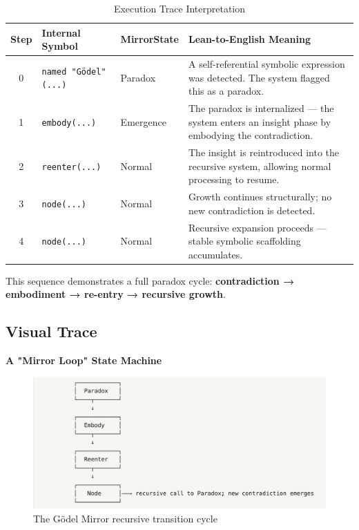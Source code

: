 \documentclass[manuscript,nonacm]{acmart}
\begin{document}
\begin{table}[H]
  \caption{Execution Trace Interpretation}
  \label{tab:execution-trace}
  \begin{tabular}{@{}cllp{7cm}@{}}
    \toprule
    \textbf{Step} & \textbf{Internal Symbol} & \textbf{MirrorState} & \textbf{Lean-to-English Meaning} \\
    \midrule
    0 & \texttt{named "Gödel" (...)} & Paradox & A self-referential symbolic expression was detected. The system flagged this as a paradox. \\
    1 & \texttt{embody(...)} & Emergence & The paradox is internalized — the system enters an insight phase by embodying the contradiction. \\
    2 & \texttt{reenter(...)} & Normal & The insight is reintroduced into the recursive system, allowing normal processing to resume. \\
    3 & \texttt{node(...)} & Normal & Growth continues structurally; no new contradiction is detected. \\
    4 & \texttt{node(...)} & Normal & Recursive expansion proceeds — stable symbolic scaffolding accumulates. \\
    \bottomrule
  \end{tabular}
\end{table}

This sequence demonstrates a full paradox cycle: \textbf{contradiction → embodiment → re-entry → recursive growth}.

\subsection{Visual Trace}

\textbf{A "Mirror Loop" State Machine}

\begin{figure}[H]
    \centering
    \includegraphics[width=0.7\linewidth]{loop.png}
    \caption{The Gödel Mirror recursive transition cycle}
    \label{fig:mirror-loop}
\end{figure}
\end{document}

